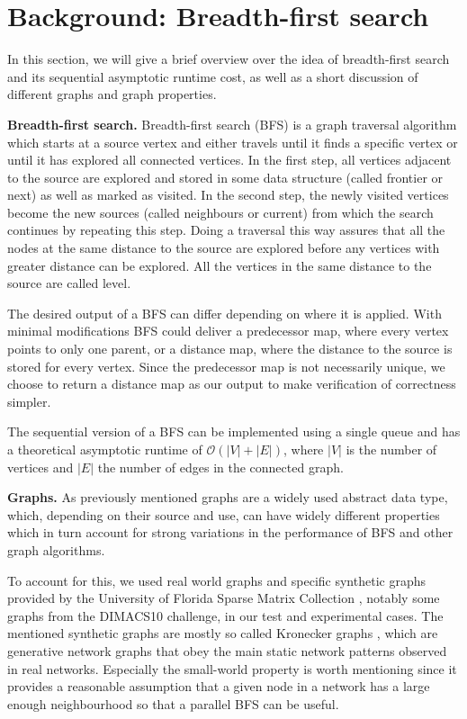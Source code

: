 \documentclass[letterpaper]{article}
\newcommand{\mypar}[1]{{\bf #1.}} %
\begin{document}
	\section{Background: Breadth-first search}\label{sec:background} %
		
	In this section, we will give a brief overview over the idea of breadth-first search and its sequential asymptotic runtime cost, as well as a short discussion of different graphs and graph properties. 
	
	
	\mypar{Breadth-first search}
	Breadth-first search (BFS) is a graph traversal algorithm which starts at a source vertex and either travels until it finds a specific vertex or until it has explored all connected vertices. 
	In the first step, all vertices adjacent to the source are explored and stored in some data structure (called frontier or next) as well as marked as visited. 
	In the second step, the newly visited vertices become the new sources (called neighbours or current) from which the search continues by repeating this step. 
	Doing a traversal this way assures that all the nodes at the same distance to the source are explored before any vertices with greater distance can be explored. 
	All the vertices in the same distance to the source are called level.
	
	The desired output of a BFS can differ depending on where it is applied. With minimal modifications BFS could deliver a predecessor map, where every vertex points to only one parent, or a distance map, where the distance to the source is stored for every vertex. Since the predecessor map is not necessarily unique, we choose to return a distance map as our output to make verification of correctness simpler.  
	
	The sequential version of a BFS can be implemented using a single queue and has a theoretical asymptotic runtime of $\mathcal{O}(\lvert V\rvert + \lvert E\rvert )$, where $\lvert V\rvert$ is the number of vertices and $\lvert E\rvert$ the number of edges in the connected graph.
	
	
	\mypar{Graphs}
	As previously mentioned graphs are a widely used abstract data type, which, depending on their source and use, can have widely different properties which in turn account for strong variations in the performance of BFS and other graph algorithms.
	
	To account for this, we used real world graphs and specific synthetic graphs provided by the University of Florida Sparse Matrix Collection \cite{SparseMatrixCollection}, notably some graphs from the DIMACS10 challenge, in our test and experimental cases.
	The mentioned synthetic graphs are mostly so called Kronecker graphs \cite{Leskovec:2010:KGA:1756006.1756039}, which are generative network graphs that obey the main static network patterns observed in real networks.
	Especially the small-world property is worth mentioning since it provides a reasonable assumption that a given node in a network has a large enough neighbourhood so that a parallel BFS can be useful.	
	
\end{document}
